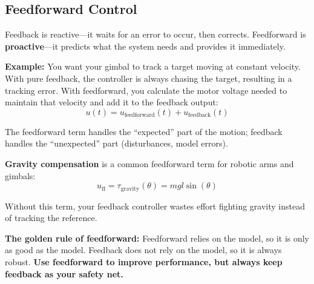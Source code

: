 \subsection{Feedforward Control}

Feedback is reactive---it waits for an error to occur, then corrects. Feedforward is \textbf{proactive}---it predicts what the system needs and provides it immediately.

\textbf{Example:} You want your gimbal to track a target moving at constant velocity. With pure feedback, the controller is always chasing the target, resulting in a tracking error. With feedforward, you calculate the motor voltage needed to maintain that velocity and add it to the feedback output:
\begin{equation}
u(t) = u_{\text{feedforward}}(t) + u_{\text{feedback}}(t)
\end{equation}

The feedforward term handles the ``expected'' part of the motion; feedback handles the ``unexpected'' part (disturbances, model errors).

\textbf{Gravity compensation} is a common feedforward term for robotic arms and gimbals:
\begin{equation}
u_{\text{ff}} = \tau_{\text{gravity}}(\theta) = mgl\sin(\theta)
\end{equation}

Without this term, your feedback controller wastes effort fighting gravity instead of tracking the reference.

\textbf{The golden rule of feedforward:} Feedforward relies on the model, so it is only as good as the model. Feedback does not rely on the model, so it is always robust. \textbf{Use feedforward to improve performance, but always keep feedback as your safety net.}

